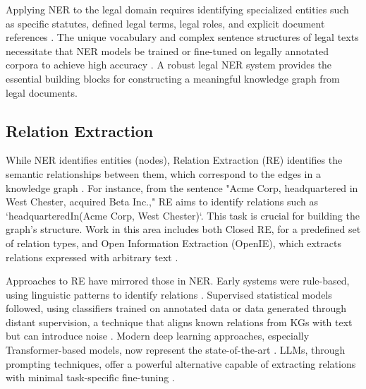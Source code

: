 Applying NER to the legal domain requires identifying specialized entities such as specific statutes, defined legal terms, legal roles, and explicit document references \parencite{RefWorks:RefID:124-au2022ener, RefWorks:RefID:125-kalamkar2022named}. The unique vocabulary and complex sentence structures of legal texts necessitate that NER models be trained or fine-tuned on legally annotated corpora to achieve high accuracy \parencite{RefWorks:RefID:64-2022lexglue}. A robust legal NER system provides the essential building blocks for constructing a meaningful knowledge graph from legal documents.

\subsection{Relation Extraction}
While NER identifies entities (nodes), Relation Extraction (RE) identifies the semantic relationships between them, which correspond to the edges in a knowledge graph \parencite{RefWorks:RefID:118-ji2022survey, RefWorks:RefID:57-carbonell2020named}. For instance, from the sentence "Acme Corp, headquartered in West Chester, acquired Beta Inc.," RE aims to identify relations such as `headquarteredIn(Acme Corp, West Chester)`. This task is crucial for building the graph's structure. Work in this area includes both Closed RE, for a predefined set of relation types, and Open Information Extraction (OpenIE), which extracts relations expressed with arbitrary text \parencite{RefWorks:RefID:134-etzioni2008acm}.

Approaches to RE have mirrored those in NER. Early systems were rule-based, using linguistic patterns to identify relations \parencite{RefWorks:RefID:136-hearst1992automatic}. Supervised statistical models followed, using classifiers trained on annotated data or data generated through distant supervision, a technique that aligns known relations from KGs with text but can introduce noise \parencite{RefWorks:RefID:139-kambhatla2004combining, RefWorks:RefID:140-mintz2009distant}. Modern deep learning approaches, especially Transformer-based models, now represent the state-of-the-art \parencite{RefWorks:RefID:141-kumar2017survey, RefWorks:RefID:142-wu2019enriching}. LLMs, through prompting techniques, offer a powerful alternative capable of extracting relations with minimal task-specific fine-tuning \parencite{RefWorks:RefID:143-chia2022relation}.

